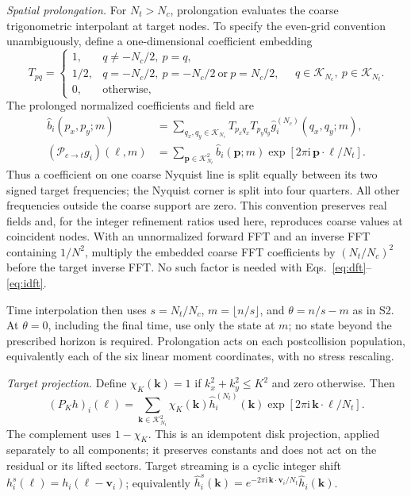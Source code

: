 \documentclass[10pt,letterpaper]{article}
\begin{document}
\textit{Spatial prolongation.} For $N_t>N_c$, prolongation evaluates the coarse trigonometric interpolant at target nodes. To specify the even-grid convention unambiguously, define a one-dimensional coefficient embedding
\begin{equation}
 T_{pq}=\begin{cases}
 1,&q\ne-N_c/2,\ p=q,\\
 1/2,&q=-N_c/2,\ p=-N_c/2\ \text{or}\ p=N_c/2,\\
 0,&\text{otherwise},
 \end{cases}
 \quad q\in\mathcal K_{N_c},\ p\in\mathcal K_{N_t}.
\end{equation}
The prolonged normalized coefficients and field are
\begin{align}
 \widehat b_i(p_x,p_y;m)
 &=\sum_{q_x,q_y\in\mathcal K_{N_c}}T_{p_xq_x}T_{p_yq_y}
 \widehat g_i^{(N_c)}(q_x,q_y;m),\label{eq:embed}\\
 (\mathcal P_{c\to t}g_i)(\bm\ell,m)
 &=\sum_{\bm p\in\mathcal K_{N_t}^2}\widehat b_i(\bm p;m)
 \exp[2\pi\mathrm i\,\bm p\cdot\bm\ell/N_t].
\end{align}
Thus a coefficient on one coarse Nyquist line is split equally between its two signed target frequencies; the Nyquist corner is split into four quarters. All other frequencies outside the coarse support are zero. This convention preserves real fields and, for the integer refinement ratios used here, reproduces coarse values at coincident nodes. With an unnormalized forward FFT and an inverse FFT containing $1/N^2$, multiply the embedded coarse FFT coefficients by $(N_t/N_c)^2$ before the target inverse FFT. No such factor is needed with Eqs.~\eqref{eq:dft}--\eqref{eq:idft}.

Time interpolation then uses $s=N_t/N_c$, $m=\lfloor n/s\rfloor$, and $\theta=n/s-m$ as in S2. At $\theta=0$, including the final time, use only the state at $m$; no state beyond the prescribed horizon is required. Prolongation acts on each postcollision population, equivalently each of the six linear moment coordinates, with no stress rescaling.

\textit{Target projection.} Define $\chi_K(\bm k)=1$ if $k_x^2+k_y^2\le K^2$ and zero otherwise. Then
\begin{equation}
 (P_Kh)_i(\bm\ell)=\sum_{\bm k\in\mathcal K_{N_t}^2}\chi_K(\bm k)
 \widehat h_i^{(N_t)}(\bm k)\exp[2\pi\mathrm i\,\bm k\cdot\bm\ell/N_t].
 \label{eq:explicitprojection}
\end{equation}
The complement uses $1-\chi_K$. This is an idempotent disk projection, applied separately to all components; it preserves constants and does not act on the residual or its lifted sectors. Target streaming is a cyclic integer shift $h_i^s(\bm\ell)=h_i(\bm\ell-\bm v_i)$; equivalently $\widehat h_i^s(\bm k)=e^{-2\pi\mathrm i\,\bm k\cdot\bm v_i/N_t}\widehat h_i(\bm k)$.
\end{document}
